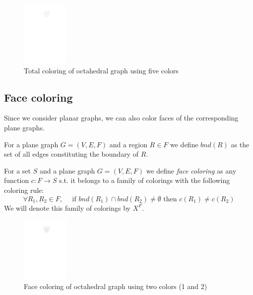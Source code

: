 \begin{figure}[H]
    \centering
    \includegraphics[width=0.2\textwidth]{../Resources/Figs/octahedral_tot_colr.pdf}
    \caption{Total coloring of octahedral graph using five colors}
    \label{fig:octahedral_tot_coloring}
\end{figure}

\begin{highlight}
\subsection{Face coloring}

Since we consider planar graphs, we can also color faces of the corresponding plane graphs.

\begin{definition}
    For a plane graph $G=(V,E,F)$ and a region $R \in F$ we define $bnd(R)$ as the set of all edges constituting the boundary of $R$.
\end{definition}

\begin{definition}
    For a set $S$ and a plane graph $G=(V,E,F)$ we define \textit{face coloring} as any function $c: F \rightarrow S$ s.t. it belongs to a family of colorings with the following coloring rule:
    \begin{equation}\label{eqn:face_rule}
     \forall R_1,R_2 \in F, \quad \text{ if } bnd(R_1) \cap bnd(R_2) \neq \emptyset \text{ then } c(R_1) \neq c(R_2) \tag{$R_F$}
    \end{equation}
    We will denote this family of colorings by $X^F$.
\end{definition}

\begin{figure}[H]
    \centering
    \includegraphics[width=0.2\textwidth]{../Resources/Figs/octahedral_face_colr.pdf}
    \caption{Face coloring of octahedral graph using two colors (1 and 2)}
    \label{fig:face_tot_coloring}
\end{figure}


\end{highlight}
